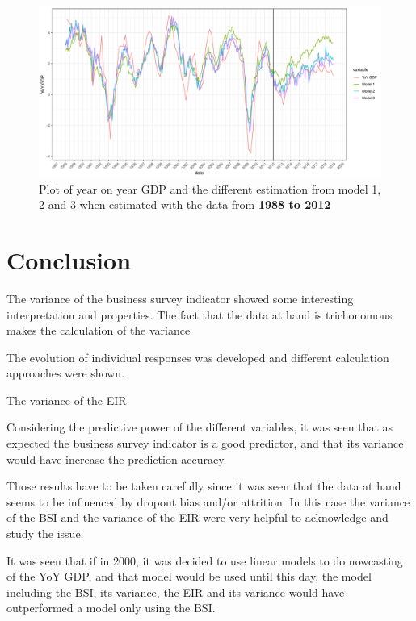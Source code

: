\documentclass[12pt,a4paper,oneside]{book}
\begin{document}
\begin{figure}[H]
    \centering
    \includegraphics[scale=0.5]{Graphs/predictions3.pdf}
    \caption{Plot of year on year GDP and the different estimation from model 1, 2 and 3 when estimated with the data from \textbf{1988 to 2012}}
    \label{fig:predictions3}
\end{figure}









\chapter{Conclusion}

The variance of the business survey indicator showed some interesting interpretation and properties. The fact that the data at hand is trichonomous makes the calculation of the variance

The evolution of individual responses was developed and different calculation approaches were shown.

The variance of the EIR

Considering the predictive power of the different variables, it was seen that as expected the business survey indicator is a good predictor, and that its variance would have increase the prediction accuracy.

Those results have to be taken carefully since it was seen that the data at hand seems to be influenced by dropout bias and/or attrition. In this case the variance of the BSI and the variance of the EIR were very helpful to acknowledge and study the issue.


It was seen that if in 2000, it was decided to use linear models to do nowcasting of the YoY GDP, and that model would be used until this day, the model including the BSI, its variance, the EIR and its variance would have outperformed a model only using the BSI.
\end{document}
